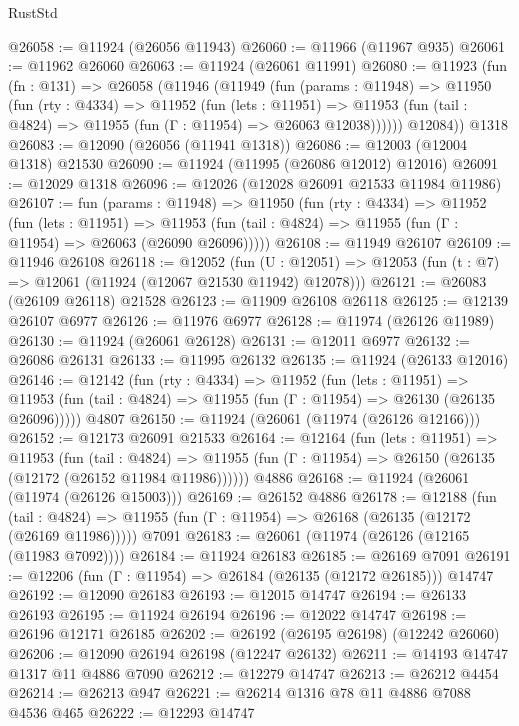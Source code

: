 \begin{lexlean}{RustStd}
\begin{coremodule}
@26058 := @11924 (@26056 @11943)
@26060 := @11966 (@11967 @935)
@26061 := @11962 @26060
@26063 := @11924 (@26061 @11991)
@26080 := @11923
    (fun (fn : @131) =>
    @26058
      (@11946
        (@11949
          (fun (params : @11948) =>
          @11950
            (fun (rty : @4334) =>
            @11952
              (fun (lets : @11951) =>
              @11953 (fun (tail : @4824) => @11955 (fun (Γ : @11954) => @26063 @12038))))))
        @12084))
    @1318
@26083 := @12090 (@26056 (@11941 @1318))
@26086 := @12003 (@12004 @1318) @21530
@26090 := @11924 (@11995 (@26086 @12012) @12016)
@26091 := @12029 @1318
@26096 := @12026 (@12028 @26091 @21533 @11984 @11986)
@26107 := fun (params : @11948) =>
  @11950
    (fun (rty : @4334) =>
    @11952
      (fun (lets : @11951) =>
      @11953 (fun (tail : @4824) => @11955 (fun (Γ : @11954) => @26063 (@26090 @26096)))))
@26108 := @11949 @26107
@26109 := @11946 @26108
@26118 := @12052
    (fun (U : @12051) => @12053 (fun (t : @7) => @12061 (@11924 (@12067 @21530 @11942) @12078)))
@26121 := @26083 (@26109 @26118) @21528
@26123 := @11909 @26108 @26118
@26125 := @12139 @26107 @6977
@26126 := @11976 @6977
@26128 := @11974 (@26126 @11989)
@26130 := @11924 (@26061 @26128)
@26131 := @12011 @6977
@26132 := @26086 @26131
@26133 := @11995 @26132
@26135 := @11924 (@26133 @12016)
@26146 := @12142
    (fun (rty : @4334) =>
    @11952
      (fun (lets : @11951) =>
      @11953 (fun (tail : @4824) => @11955 (fun (Γ : @11954) => @26130 (@26135 @26096)))))
    @4807
@26150 := @11924 (@26061 (@11974 (@26126 @12166)))
@26152 := @12173 @26091 @21533
@26164 := @12164
    (fun (lets : @11951) =>
    @11953
      (fun (tail : @4824) =>
      @11955 (fun (Γ : @11954) => @26150 (@26135 (@12172 (@26152 @11984 @11986))))))
    @4886
@26168 := @11924 (@26061 (@11974 (@26126 @15003)))
@26169 := @26152 @4886
@26178 := @12188
    (fun (tail : @4824) => @11955 (fun (Γ : @11954) => @26168 (@26135 (@12172 (@26169 @11986)))))
    @7091
@26183 := @26061 (@11974 (@26126 (@12165 (@11983 @7092))))
@26184 := @11924 @26183
@26185 := @26169 @7091
@26191 := @12206 (fun (Γ : @11954) => @26184 (@26135 (@12172 @26185))) @14747
@26192 := @12090 @26183
@26193 := @12015 @14747
@26194 := @26133 @26193
@26195 := @11924 @26194
@26196 := @12022 @14747
@26198 := @26196 @12171 @26185
@26202 := @26192 (@26195 @26198) (@12242 @26060)
@26206 := @12090 @26194 @26198 (@12247 @26132)
@26211 := @14193 @14747 @1317 @11 @4886 @7090
@26212 := @12279 @14747
@26213 := @26212 @4454
@26214 := @26213 @947
@26221 := @26214 @1316 @78 @11 @4886 @7088 @4536 @465
@26222 := @12293 @14747

\end{coremodule}
\end{lexlean}
